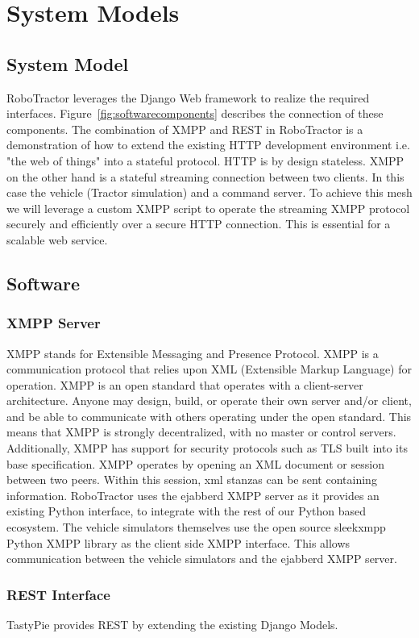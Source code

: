 \documentclass[conference,12pt]{IEEEtran}
\begin{document}
\section{System Models}

\subsection{System Model}
RoboTractor leverages the Django Web framework \autocite{_django_2014}
to realize the required interfaces. Figure~\ref{fig:softwarecomponents} describes the connection of
these components.  The combination of XMPP and REST in RoboTractor is
a demonstration of how to extend the existing HTTP development environment
i.e. "the web of things" into a stateful protocol. HTTP is by design
stateless. XMPP on the other hand is a stateful streaming connection between two
clients. In this case the vehicle (Tractor simulation) and a command server.  To achieve this mesh we
will leverage a custom XMPP script to operate the streaming XMPP protocol securely and efficiently over a secure HTTP connection. This is essential for a scalable web service. 
\subsection{Software}
\subsubsection{XMPP Server}
XMPP stands for Extensible Messaging and Presence Protocol. XMPP is a communication protocol
that relies upon XML (Extensible Markup Language) for operation. XMPP is an open standard 
that operates with a client-server architecture. Anyone may design, build, or operate their own server and/or client,
and be able to communicate with others operating under the open standard. This means that XMPP is strongly decentralized, with no master or control servers. 
Additionally, XMPP has support for security protocols such as TLS built into its base specification.
XMPP operates by opening an XML document or session between two peers. Within this session, xml stanzas can be sent containing information.
RoboTractor uses the ejabberd \autocite{_ejabberd} XMPP server as it provides an existing Python
interface, to integrate with the rest of our Python based ecosystem. The vehicle simulators themselves use the open source sleekxmpp Python XMPP library as the client side XMPP interface. This allows communication between the vehicle simulators and the ejabberd XMPP server.
\subsubsection{REST Interface}
TastyPie provides REST \autocite{_toastdriven/django-tastypie_2014} by extending
the existing Django Models.
\end{document}
